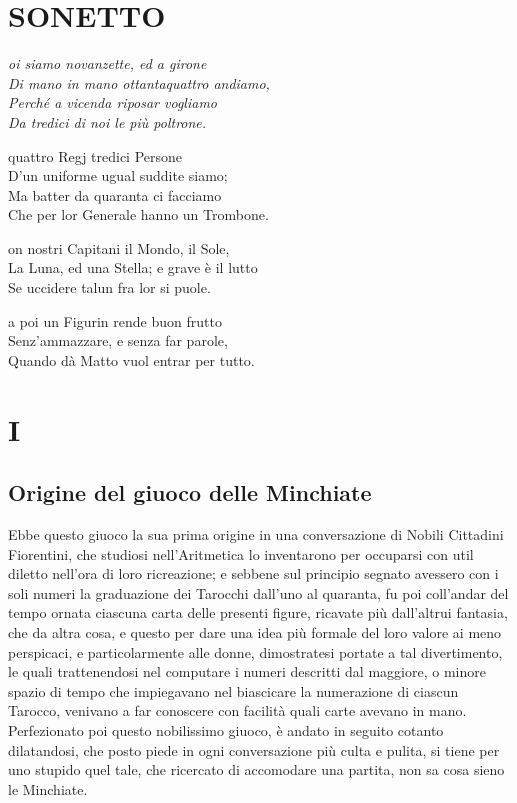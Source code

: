 \documentclass[11pt,a6paper]{article}
\begin{document}
\section*{SONETTO}
{\it
\-\hspace{-6pt}{\LARGE N}oi siamo novanzette, ed a girone\\
Di mano in mano ottantaquattro andiamo, \\
Perché a vicenda riposar vogliamo \\
Da tredici di noi le più poltrone. 

\vspace{6pt}

\noindent\-\hspace{-6pt}{\LARGE A} quattro Regj tredici Persone\\
D'un uniforme ugual suddite siamo;\\ 
Ma batter da quaranta ci facciamo \\
Che per lor Generale hanno un Trombone. 

\vspace{6pt}

\noindent\-\hspace{-6pt}{\LARGE S}on nostri Capitani il Mondo, il Sole,\\
La Luna, ed una Stella; e grave è il lutto \\
Se uccidere talun fra lor si puole. 

\vspace{6pt}

\noindent\-\hspace{-6pt}{\LARGE M}a poi un Figurin rende buon frutto\\
Senz'ammazzare, e senza far parole, \\
Quando dà Matto vuol entrar per tutto.
}
\clearpage
{}
\section{I}
\subsection*{Origine del giuoco delle Minchiate}

Ebbe questo giuoco la sua prima origine in una conversazione di Nobili Cittadini Fiorentini, che studiosi nell'Aritmetica lo inventarono per occuparsi con util diletto nell'ora di loro ricreazione; e sebbene sul principio segnato avessero con i soli numeri la graduazione dei Tarocchi dall'uno al quaranta, fu poi coll'andar del tempo ornata ciascuna carta delle presenti figure, ricavate più dall'altrui fantasia, che da altra cosa, e questo per dare una idea più formale del loro valore ai meno perspicaci, e particolarmente alle donne, dimostratesi portate a tal divertimento, le quali trattenendosi nel computare i numeri descritti dal maggiore, o minore spazio di tempo che impiegavano nel biascicare la numerazione di ciascun Tarocco, venivano a far conoscere con facilità quali carte avevano in mano. Perfezionato poi questo nobilissimo giuoco, è andato in seguito cotanto dilatandosi, che posto piede in ogni conversazione più culta e pulita, si tiene per uno stupido quel tale, che ricercato di accomodare una partita, non sa cosa sieno le Minchiate.
\end{document}
